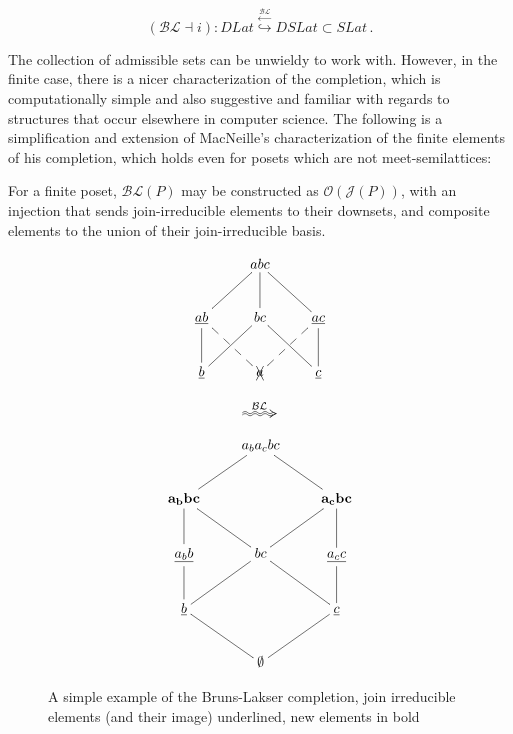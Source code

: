 \documentclass[a4paper,USenglish,cleveref, autoref, thm-restate,authorcolumns]{lipics-v2019}
\newcommand{\Oc}{\mathcal{O}}
\newcommand{\Jc}{\mathcal{J}}
\newcommand{\BLc}{\mathcal{BL}}
\begin{document}
\begin{equation*}
  (\BLc \dashv i) :  DLat \stackrel{\stackrel{\BLc}{\leftarrow}}{\hookrightarrow}
  DSLat \subset SLat
  \,.
\end{equation*}

The collection of admissible sets can be unwieldy to work with. However, in the finite case, there is a nicer characterization of the completion, which is computationally simple and also suggestive and familiar with regards to structures that occur elsewhere in computer science. The following is a simplification and extension of MacNeille's characterization of the finite elements of his completion, which holds even for posets which are not meet-semilattices:

\begin{lemma}
For a finite poset, \(\BLc(P)\) may be constructed as \(\Oc(\Jc(P))\), with an injection that sends join-irreducible elements to their downsets, and composite elements to the union of their join-irreducible basis.
\end{lemma}



\begin{figure}
\centering
\begin{minipage}[c]{0.3\textwidth}
\begin{equation*}
    \xymatrix{& abc \ar@{-}[dl] \ar@{-}[d] \ar@{-}[dr] & \\
      \underline{ab} \ar@{-}[d] \ar@{--}[dr] & bc \ar@{-}[dl] \ar@{-}[dr] &
        \underline{ac} \ar@{-}[d] \ar@{--}[dl] \\
        \underline{b} & \xcancel{a}  & \underline{c} }         
\end{equation*}
\end{minipage}
\begin{minipage}[c]{0.08\textwidth}
  \begin{equation*}
    \xymatrix{\ar@2{~>}[r]^{\BLc} &}
  \end{equation*}
\end{minipage}
\begin{minipage}[c]{0.3\textwidth}
\begin{equation*}
    \xymatrix{& a_ba_cbc \ar@{-}[dl]  \ar@{-}[dr] & \\
      \mathbf{a_bbc} \ar@{-}[d] \ar@{-}[dr] & &
        \mathbf{a_cbc} \ar@{-}[d] \ar@{-}[dl]\\
        \underline{a_bb} \ar@{-}[d] & bc \ar@{-}[dl] \ar@{-}[dr] &
          \underline{a_cc} \ar@{-}[d] \\
         \underline{b} \ar@{-}[dr] & & \underline{c} \ar@{-}[dl] \\
      & \mathbf{\emptyset} }
\end{equation*}
\end{minipage}
\caption{A simple example of the Bruns-Lakser completion, join irreducible elements (and their image) underlined, new elements in bold}
\label{Fig1}
\end{figure}
\end{document}
